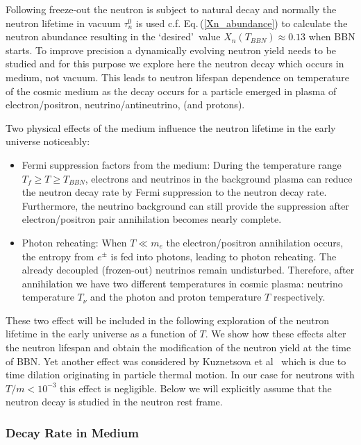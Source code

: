 Following freeze-out the neutron is subject to natural decay and normally the neutron lifetime in vacuum $\tau_n^0$ is used c.f. Eq.\,(\ref{Xn_abundance}) to calculate the neutron abundance resulting in the \lq desired\rq\ value $X_n(T_{BBN})\approx0.13$ when BBN starts. To improve precision a dynamically evolving neutron yield needs to be studied and for this purpose we explore here the neutron decay which occurs in  medium, not vacuum. This leads to  neutron lifespan dependence on temperature of the cosmic medium as the decay occurs for a particle emerged in plasma of electron/positron, neutrino/antineutrino, (and protons).

Two physical effects of the medium  influence the neutron lifetime in the early universe noticeably:
\begin{itemize}
\item Fermi suppression factors from the medium: 
During the temperature range $T_f\geqslant T\geqslant T_{BBN}$, electrons and neutrinos in the background plasma can reduce the neutron decay rate by Fermi suppression to the neutron decay rate. Furthermore, the neutrino background can still provide the suppression after electron/positron pair annihilation becomes nearly complete.
\item Photon reheating:
When $T\ll m_e$ the electron/positron annihilation occurs, the entropy from $e^\pm$ is fed into photons, leading to photon reheating. The already decoupled (frozen-out) neutrinos remain undisturbed. Therefore, after annihilation we have two different temperatures in cosmic plasma: neutrino temperature $T_\nu$ and the photon and proton temperature $T$ respectively.
\end{itemize}
These two effect will be included in the following exploration of the neutron lifetime in the early universe as a function of $T$. We show how these effects alter the neutron lifespan and obtain the modification of the neutron yield at the time of BBN. Yet another effect was considered by Kuznetsova et al~\cite{Kuznetsova:2010pi} which is due to time dilation originating in particle thermal motion. In our case for neutrons with $T/m<10^{-3}$ this effect is negligible. Below we will explicitly assume that the neutron decay is studied in the neutron rest frame.

\subsubsection{Decay Rate in Medium}\label{Rate_Medium}

